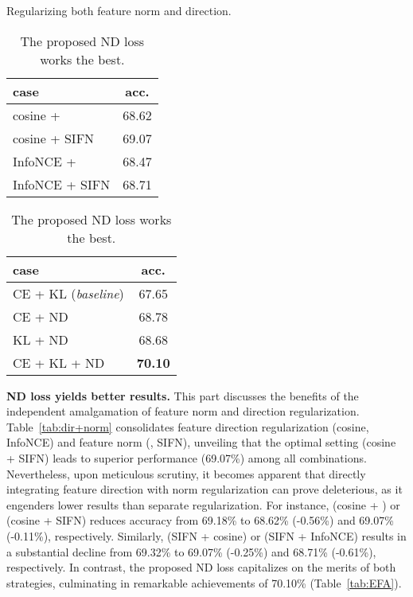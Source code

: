 \documentclass{article}
\begin{document}
\begin{table}[b]
\begin{subtable}[h]{0.25\textwidth}
        \caption{Regularizing both feature norm and direction.}
        \vspace{-2mm}
        \begin{tabular}{lc}
        case &  acc. \\
        \hline
        \toprule
        cosine +  & 68.62\\
        cosine + SIFN & 69.07\\
        InfoNCE +  & 68.47\\
        InfoNCE + SIFN & 68.71\\
\end{tabular}
\label{tab:dir+norm}
    \end{subtable}
    \begin{subtable}[h]{0.25\textwidth}
        \renewcommand{\arraystretch}{1.2}
        \setlength\tabcolsep{1.5pt}
        \small
        \centering
        \caption{The proposed ND loss works the best.}
        \vspace{-2mm}
        \begin{tabular}{lc}
        case &  acc. \\
        \hline
        \toprule
        CE + KL (\emph{baseline}) & 67.65\\
CE + ND & 68.78\\
        KL + ND & 68.68\\
        CE + KL + ND  & \textbf{70.10}\\
\end{tabular}
\label{tab:EFA}
    \end{subtable}
\label{tab:ablation}
\end{table} 
\textbf{ND loss yields better results.} This part discusses the benefits of the independent amalgamation of feature norm and direction regularization. Table~\ref{tab:dir+norm} consolidates feature direction regularization (cosine, InfoNCE) and feature norm (, SIFN), unveiling that the optimal setting (cosine + SIFN) leads to superior performance (69.07\%) among all combinations. Nevertheless, upon meticulous scrutiny, it becomes apparent that directly integrating feature direction with norm regularization can prove deleterious, as it engenders lower results than separate regularization. For instance, (cosine + ) or (cosine + SIFN) reduces accuracy from 69.18\% to 68.62\% (-0.56\%) and 69.07\% (-0.11\%), respectively. Similarly, (SIFN + cosine) or (SIFN + InfoNCE) results in a substantial decline from 69.32\% to 69.07\% (-0.25\%) and 68.71\% (-0.61\%), respectively. In contrast, the proposed ND loss capitalizes on the merits of both strategies, culminating in remarkable achievements of 70.10\% (Table~\ref{tab:EFA}).
\end{document}
